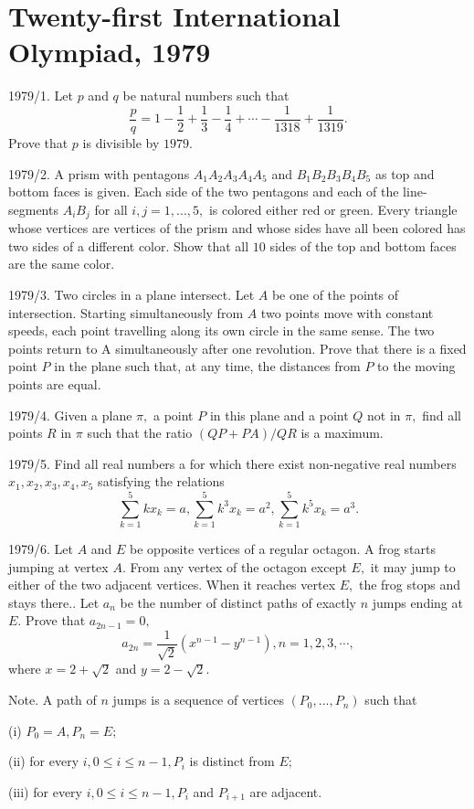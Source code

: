 \documentclass[12pt,thmsa]{article}
\begin{document}
\section{Twenty-first International Olympiad, 1979}

1979/1. Let $p$ and $q$ be natural numbers such that 
\[
\frac{p}{q}=1-\frac{1}{2}+\frac{1}{3}-\frac{1}{4}+\cdots -\frac{1}{1318}+%
\frac{1}{1319}. 
\]
Prove that $p$ is divisible by $1979.$

1979/2. A prism with pentagons $A_{1}A_{2}A_{3}A_{4}A_{5}$ and $%
B_{1}B_{2}B_{3}B_{4}B_{5}$ as top and bottom faces is given. Each side of
the two pentagons and each of the line-segments $A_{i}B_{j}$ for all $%
i,j=1,...,5,$ is colored either red or green. Every triangle whose vertices
are vertices of the prism and whose sides have all been colored has two
sides of a different color. Show that all $10$ sides of the top and bottom
faces are the same color.

1979/3. Two circles in a plane intersect. Let $A$ be one of the points of
intersection. Starting simultaneously from $A$ two points move with constant
speeds, each point travelling along its own circle in the same sense. The
two points return to A simultaneously after one revolution. Prove that there
is a fixed point $P$ in the plane such that, at any time, the distances from 
$P$ to the moving points are equal.

1979/4. Given a plane $\pi ,$ a point $P$ in this plane and a point $Q$ not
in $\pi ,$ find all points $R$ in $\pi $ such that the ratio $(QP+PA)/QR$ is
a maximum.

1979/5. Find all real numbers a for which there exist non-negative real
numbers $x_{1},x_{2},x_{3},x_{4},x_{5}$ satisfying the relations 
\[
\sum_{k=1}^{5}kx_{k}=a,\sum_{k=1}^{5}k^{3}x_{k}=a^{2},%
\sum_{k=1}^{5}k^{5}x_{k}=a^{3}. 
\]

1979/6. Let $A$ and $E$ be opposite vertices of a regular octagon. A frog
starts jumping at vertex $A$. From any vertex of the octagon except $E,$ it
may jump to either of the two adjacent vertices. When it reaches vertex $E,$
the frog stops and stays there.. Let $a_{n}$ be the number of distinct paths
of exactly $n$ jumps ending at $E.$ Prove that $a_{2n-1}=0,$%
\[
a_{2n}=\frac{1}{\sqrt{2}}(x^{n-1}-y^{n-1}),n=1,2,3,\cdots , 
\]
where $x=2+\sqrt{2}$ and $y=2-\sqrt{2}.$

Note. A path of $n$ jumps is a sequence of vertices $(P_{0},...,P_{n})$ such
that

(i) $P_{0}=A,P_{n}=E;$

(ii) for every $i,0\le i\le n-1,P_{i}$ is distinct from $E;$

(iii) for every $i,0\leq i\leq n-1,P_{i}$ and $P_{i+1}$ are adjacent.
\end{document}
